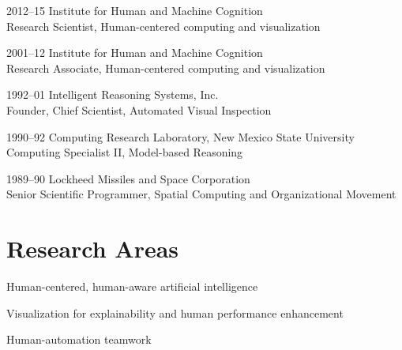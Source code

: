 \documentclass[12pt,letterpaper]{report}
\newcommand{\listitemspace}{0.25em}
\renewenvironment{itemize}
{\begin{list}{}{\setlength{\leftmargin}{0em}
                \setlength{\parskip}{0em}
                \setlength{\itemsep}{\listitemspace}
                \setlength{\parsep}{\listitemspace}}}
{\end{list}}
\begin{document}
    \begin{tablist}

        \item[2012--15]   \tab{}Institute for Human and Machine Cognition\\
                              Research Scientist, Human-centered computing and visualization

        \item[2001--12]   \tab{}Institute for Human and Machine Cognition\\
                              Research Associate, Human-centered computing and visualization
                              
        \item[1992--01]\tab{}Intelligent Reasoning Systems, Inc.\\
                              Founder, Chief Scientist, Automated Visual Inspection
 
         \item[1990--92]\tab{}Computing Research Laboratory, New Mexico State University\\
                              Computing Specialist II, Model-based Reasoning
                              
        \item[1989--90]\tab{}Lockheed Missiles and Space Corporation\\
                              Senior Scientific Programmer, Spatial Computing and Organizational Movement
    \end{tablist}

    \section*{Research Areas}

    \begin{itemize}

        \item Human-centered, human-aware artificial intelligence
        \item Visualization for explainability and human performance enhancement
        \item Human-automation teamwork

    \end{itemize}
\end{document}
